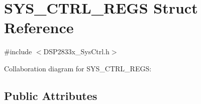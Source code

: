 \hypertarget{struct_s_y_s___c_t_r_l___r_e_g_s}{}\section{S\+Y\+S\+\_\+\+C\+T\+R\+L\+\_\+\+R\+E\+G\+S Struct Reference}
\label{struct_s_y_s___c_t_r_l___r_e_g_s}


{\ttfamily \#include $<$D\+S\+P2833x\+\_\+\+Sys\+Ctrl.\+h$>$}



Collaboration diagram for S\+Y\+S\+\_\+\+C\+T\+R\+L\+\_\+\+R\+E\+G\+S\+:
\subsection*{Public Attributes}
